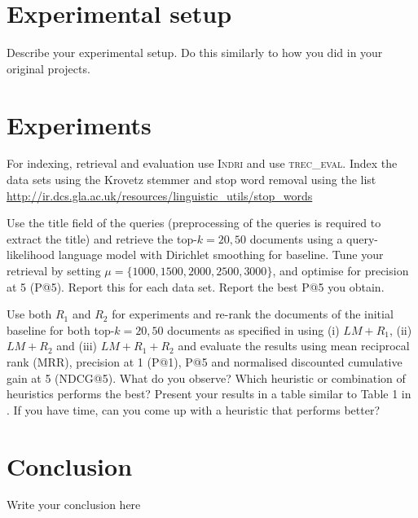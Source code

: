 \documentclass{sig-alternate}
\begin{document}
\section{Experimental setup}
Describe your experimental setup. Do this similarly to how you did in your original projects.

\section{Experiments}
For indexing, retrieval and evaluation use \textsc{Indri} and use \textsc{trec\_eval}. Index the data sets using the Krovetz stemmer and stop word removal using the list \url{http://ir.dcs.gla.ac.uk/resources/linguistic_utils/stop_words}

Use the title field of the queries (preprocessing of the queries is required to extract the title) and retrieve the top-$k = 20,50$ documents using a query-likelihood language model with Dirichlet smoothing for baseline. Tune your retrieval by setting $\mu = \{1000,1500,2000,2500,3000\}$, and optimise for precision at 5 (P@5). Report this for each data set. Report the best P@5 you obtain. 

Use both $R_1$ and $R_2$ for experiments and re-rank the documents of the initial baseline for both top-$k = 20,50$ documents as specified in \cite{woo2010achieving} using (i) $LM+R_1$, (ii) $LM+R_2$ and (iii) $LM+R_1+R_2$ and evaluate the results using mean reciprocal rank (MRR), precision at 1 (P@1), P@5 and normalised discounted cumulative gain at 5 (NDCG@5). What do you observe? Which heuristic or combination of heuristics performs the best? Present your results in a table similar to Table 1 in \cite{woo2010achieving}. If you have time, can you come up with a heuristic that performs better?

\section{Conclusion}
Write your conclusion here

\end{document}
